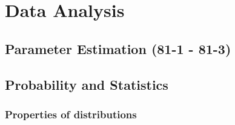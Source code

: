 \documentclass{mitqualif}
\begin{document}
\section{Data Analysis}
\subsection{Parameter Estimation (81-1 - 81-3)}



\subsection{Probability and Statistics}
\subsubsection{Properties of distributions}
 


\newpage

\newpage
\printindex
\newpage
%
\end{document}
